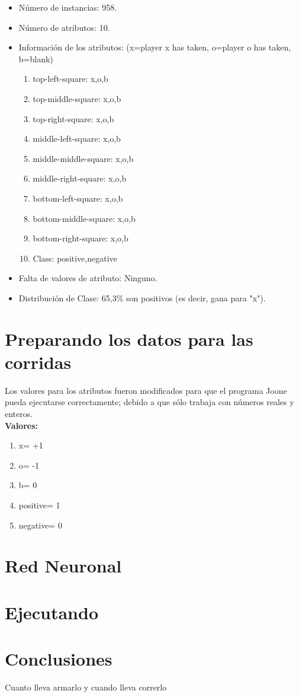 \documentclass[12pt,titlepage]{article}
\begin{document}
\begin{itemize}
 \item N\'umero de instancias: 958.
 \item N\'umero de atributos: 10.
 \item Informaci\'on de los atributos: (x=player x has taken, o=player o has taken, b=blank)
    \begin{enumerate}
      \item top-left-square: {x,o,b}
      \item top-middle-square: {x,o,b}
      \item top-right-square: {x,o,b}
      \item middle-left-square: {x,o,b}
      \item middle-middle-square: {x,o,b}
      \item middle-right-square: {x,o,b}
      \item bottom-left-square: {x,o,b}
      \item bottom-middle-square: {x,o,b}
      \item bottom-right-square: {x,o,b}
      \item Class: {positive,negative}
    \end{enumerate}
 \item Falta de valores de atributo: Ninguno.
 \item Distribución de Clase: 65,3\% son positivos (es decir, gana para "x").
\end{itemize}

\section{Preparando los datos para las corridas}
Los valores para los atributos fueron modificados para que el programa Joone pueda ejecutarse correctamente;
debido a que s\'olo trabaja con n\'umeros reales y enteros. \\
{\bf{Valores:}}
    \begin{enumerate}
      \item x= +1
      \item o= -1
      \item b= 0
      \item positive= 1
      \item negative= 0
    \end{enumerate}

\section{Red Neuronal}


\section{Ejecutando}



\section{Conclusiones}
Cuanto lleva armarlo y cuando lleva correrlo



\end{document}
